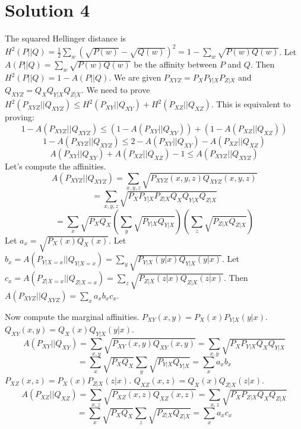 \documentclass{article}
\begin{document}
\section*{Solution 4}
The squared Hellinger distance is $H^2(P||Q) = \frac{1}{2} \sum_w (\sqrt{P(w)} - \sqrt{Q(w)})^2 = 1 - \sum_w \sqrt{P(w)Q(w)}$.
Let $A(P||Q) = \sum_w \sqrt{P(w)Q(w)}$ be the affinity between $P$ and $Q$. Then $H^2(P||Q) = 1 - A(P||Q)$.
We are given $P_{XYZ} = P_X P_{Y|X} P_{Z|X}$ and $Q_{XYZ} = Q_X Q_{Y|X} Q_{Z|X}$.
We need to prove $H^2(P_{XYZ} || Q_{XYZ}) \le H^2(P_{XY} || Q_{XY}) + H^2(P_{XZ} || Q_{XZ})$.
This is equivalent to proving:
\[ 1 - A(P_{XYZ} || Q_{XYZ}) \le (1 - A(P_{XY} || Q_{XY})) + (1 - A(P_{XZ} || Q_{XZ}) ) \]
\[ 1 - A(P_{XYZ} || Q_{XYZ}) \le 2 - A(P_{XY} || Q_{XY}) - A(P_{XZ} || Q_{XZ}) \]
\[ A(P_{XY} || Q_{XY}) + A(P_{XZ} || Q_{XZ}) - 1 \le A(P_{XYZ} || Q_{XYZ}) \]
Let's compute the affinities.
\[ A(P_{XYZ} || Q_{XYZ}) = \sum_{x,y,z} \sqrt{P_{XYZ}(x,y,z) Q_{XYZ}(x,y,z)} \]
\[ = \sum_{x,y,z} \sqrt{P_X P_{Y|X} P_{Z|X} Q_X Q_{Y|X} Q_{Z|X}} \]
\[ = \sum_x \sqrt{P_X Q_X} \left( \sum_y \sqrt{P_{Y|X} Q_{Y|X}} \right) \left( \sum_z \sqrt{P_{Z|X} Q_{Z|X}} \right) \]
Let $a_x = \sqrt{P_X(x) Q_X(x)}$.
Let $b_x = A(P_{Y|X=x} || Q_{Y|X=x}) = \sum_y \sqrt{P_{Y|X}(y|x) Q_{Y|X}(y|x)}$.
Let $c_x = A(P_{Z|X=x} || Q_{Z|X=x}) = \sum_z \sqrt{P_{Z|X}(z|x) Q_{Z|X}(z|x)}$.
Then $A(P_{XYZ} || Q_{XYZ}) = \sum_x a_x b_x c_x$.

Now compute the marginal affinities.
$P_{XY}(x,y) = P_X(x) P_{Y|X}(y|x)$. $Q_{XY}(x,y) = Q_X(x) Q_{Y|X}(y|x)$.
\[ A(P_{XY} || Q_{XY}) = \sum_{x,y} \sqrt{P_{XY}(x,y) Q_{XY}(x,y)} = \sum_{x,y} \sqrt{P_X P_{Y|X} Q_X Q_{Y|X}} \]
\[ = \sum_x \sqrt{P_X Q_X} \sum_y \sqrt{P_{Y|X} Q_{Y|X}} = \sum_x a_x b_x \]
$P_{XZ}(x,z) = P_X(x) P_{Z|X}(z|x)$. $Q_{XZ}(x,z) = Q_X(x) Q_{Z|X}(z|x)$.
\[ A(P_{XZ} || Q_{XZ}) = \sum_{x,z} \sqrt{P_{XZ}(x,z) Q_{XZ}(x,z)} = \sum_{x,z} \sqrt{P_X P_{Z|X} Q_X Q_{Z|X}} \]
\[ = \sum_x \sqrt{P_X Q_X} \sum_z \sqrt{P_{Z|X} Q_{Z|X}} = \sum_x a_x c_x \]
\end{document}
